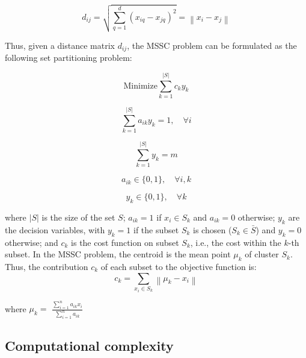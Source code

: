 \begin{equation}
d_{ij} = \sqrt{\sum_{q=1}^{d}(x_{iq} - x_{jq})^2} = \left \| x_i - x_j \right \|
\end{equation}

Thus, given a distance matrix $d_{ij}$, the MSSC problem can be formulated as the following set partitioning problem:

\begin{equation} \label{eq:of}
\textrm{Minimize} \sum_{k=1}^{\left | S \right |}c_ky_k
\end{equation}

\begin{equation}
\sum_{k=1}^{\left | S \right |}a_{ik}y_k = 1, \quad \forall i
\end{equation}

\begin{equation}
\sum_{k=1}^{\left | S \right |}y_k = m
\end{equation}

\begin{equation}
a_{ik} \in \{0,1\}, \quad \forall i,k
\end{equation}

\begin{equation}
y_k \in \{0,1\}, \quad \forall k
\end{equation}

\noindent where $\left | S \right |$ is the size of the set $S$; $a_{ik} = 1$ if $x_i \in S_k$ and $a_{ik} = 0$ otherwise; $y_k$ are the decision variables, with $y_k = 1$ if the subset $S_k$ is chosen ($S_k \in \bar{S}$) and $y_k = 0$ otherwise; and $c_k$ is the cost function on subset $S_k$, i.e., the cost within the $k$-th subset. In the MSSC problem, the centroid is the mean point $\mu_k$ of cluster $S_k$. Thus, the contribution $c_k$ of each subset to the objective function is:
	\begin{equation}
	c_k = \sum_{x_i \in S_k}\left \| \mu_k - x_i \right \|
	\end{equation}
	\begin{center}
	where $\mu_k = $ \Large $\frac{\sum_{i = 1}^{n}a_{ik}x_i}{\sum_{i = 1}^{n}a_{ik}}$	
	\end{center}
	
\subsection{Computational complexity}

